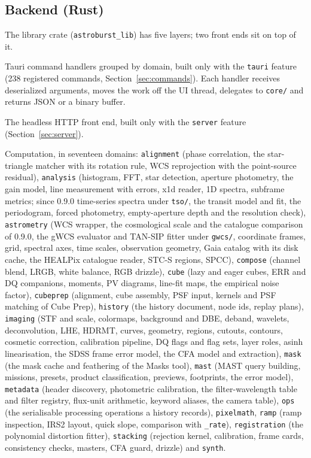 \documentclass[11pt,a4paper]{article}
\newcommand{\code}[1]{\texttt{\small #1}}
\newcommand{\nCommands}{238}
\begin{document}
    \subsection{Backend (Rust)}

    The library crate (\code{astroburst\_lib}) has five layers; two front ends sit on top of it.

    \begin{description}[style=nextline, leftmargin=2cm]
    \item[\texttt{cmd/}] Tauri command handlers grouped by domain, built only with the \code{tauri} feature (\nCommands{} registered commands, Section~\ref{sec:commands}). Each handler receives deserialized arguments, moves the work off the UI thread, delegates to \code{core/} and returns JSON or a binary buffer.
    \item[\texttt{server/}] The headless HTTP front end, built only with the \code{server} feature (Section~\ref{sec:server}).
    \item[\texttt{core/}] Computation, in seventeen domains: \code{alignment} (phase correlation, the star-triangle matcher with its rotation rule, WCS reprojection with the point-source residual), \code{analysis} (histogram, FFT, star detection, aperture photometry, the gain model, line measurement with errors, x1d reader, 1D spectra, subframe metrics; since 0.9.0 time-series spectra under \code{tso/}, the transit model and fit, the periodogram, forced photometry, empty-aperture depth and the resolution check), \code{astrometry} (WCS wrapper, the cosmological scale and the catalogue comparison of 0.9.0, the gWCS evaluator and TAN-SIP fitter under \code{gwcs/}, coordinate frames, grid, spectral axes, time scales, observation geometry, Gaia catalog with its disk cache, the HEALPix catalogue reader, STC-S regions, SPCC), \code{compose} (channel blend, LRGB, white balance, RGB drizzle), \code{cube} (lazy and eager cubes, ERR and DQ companions, moments, PV diagrams, line-fit maps, the empirical noise factor), \code{cubeprep} (alignment, cube assembly, PSF input, kernels and PSF matching of Cube Prep), \code{history} (the history document, node ids, replay plans), \code{imaging} (STF and scale, colormaps, background and DBE, deband, wavelets, deconvolution, LHE, HDRMT, curves, geometry, regions, cutouts, contours, cosmetic correction, calibration pipeline, DQ flags and flag sets, layer roles, asinh linearisation, the SDSS frame error model, the CFA model and extraction), \code{mask} (the mask cache and feathering of the Masks tool), \code{mast} (MAST query building, missions, presets, product classification, previews, footprints, the error model), \code{metadata} (header discovery, photometric calibration, the filter-wavelength table and filter registry, flux-unit arithmetic, keyword aliases, the camera table), \code{ops} (the serialisable processing operations a history records), \code{pixelmath}, \code{ramp} (ramp inspection, IRS2 layout, quick slope, comparison with \code{\_rate}), \code{registration} (the polynomial distortion fitter), \code{stacking} (rejection kernel, calibration, frame cards, consistency checks, masters, CFA guard, drizzle) and \code{synth}.

\end{description}
\end{document}
